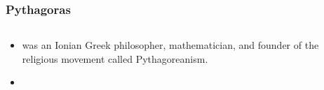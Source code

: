 \begin{module}[id=pythagoras]

\begin{frame}
  \frametitle{Pythagoras}
  \begin{columns}
    \begin{column}{5.8cm}
      \begin{itemize}
      \item
      \begin{definition}
         was an Ionian Greek philosopher, mathematician, and founder of the religious movement called Pythagoreanism.
      \end{definition}
       \item {}

    \end{itemize}
    \end{column}
    \begin{column}{5.5cm}
    \end{column}
  \end{columns}
\end{frame}
\end{module}
